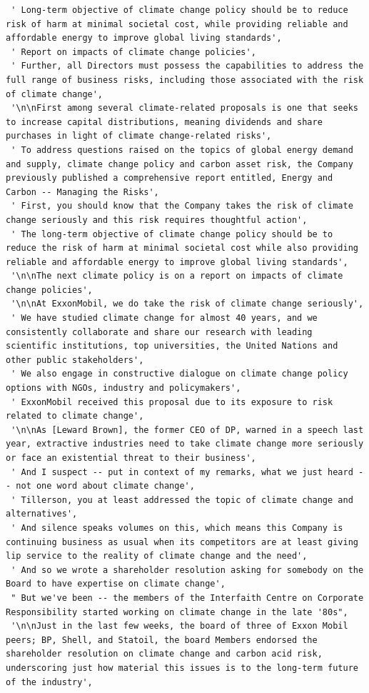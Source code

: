 \documentclass[
  letterpaper,
  DIV=11,
  numbers=noendperiod]{scrreprt}
\begin{document}
\begin{verbatim}
 ' Long-term objective of climate change policy should be to reduce risk of harm at minimal societal cost, while providing reliable and affordable energy to improve global living standards',
 ' Report on impacts of climate change policies',
 ' Further, all Directors must possess the capabilities to address the full range of business risks, including those associated with the risk of climate change',
 '\n\nFirst among several climate-related proposals is one that seeks to increase capital distributions, meaning dividends and share purchases in light of climate change-related risks',
 ' To address questions raised on the topics of global energy demand and supply, climate change policy and carbon asset risk, the Company previously published a comprehensive report entitled, Energy and Carbon -- Managing the Risks',
 ' First, you should know that the Company takes the risk of climate change seriously and this risk requires thoughtful action',
 ' The long-term objective of climate change policy should be to reduce the risk of harm at minimal societal cost while also providing reliable and affordable energy to improve global living standards',
 '\n\nThe next climate policy is on a report on impacts of climate change policies',
 '\n\nAt ExxonMobil, we do take the risk of climate change seriously',
 ' We have studied climate change for almost 40 years, and we consistently collaborate and share our research with leading scientific institutions, top universities, the United Nations and other public stakeholders',
 ' We also engage in constructive dialogue on climate change policy options with NGOs, industry and policymakers',
 ' ExxonMobil received this proposal due to its exposure to risk related to climate change',
 '\n\nAs [Leward Brown], the former CEO of DP, warned in a speech last year, extractive industries need to take climate change more seriously or face an existential threat to their business',
 ' And I suspect -- put in context of my remarks, what we just heard -- not one word about climate change',
 ' Tillerson, you at least addressed the topic of climate change and alternatives',
 ' And silence speaks volumes on this, which means this Company is continuing business as usual when its competitors are at least giving lip service to the reality of climate change and the need',
 ' And so we wrote a shareholder resolution asking for somebody on the Board to have expertise on climate change',
 " But we've been -- the members of the Interfaith Centre on Corporate Responsibility started working on climate change in the late '80s",
 '\n\nJust in the last few weeks, the board of three of Exxon Mobil peers; BP, Shell, and Statoil, the board Members endorsed the shareholder resolution on climate change and carbon acid risk, underscoring just how material this issues is to the long-term future of the industry',

\end{verbatim}
\end{document}
